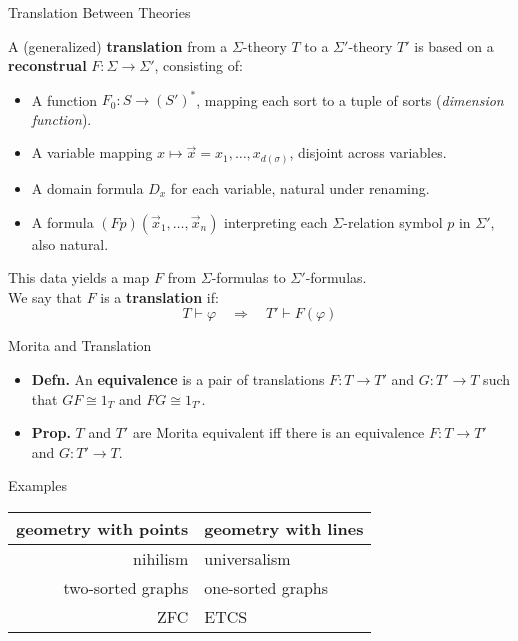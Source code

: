 \documentclass[fleqn]{beamer}
\begin{document}
\begin{frame}{Translation Between Theories}

\small

A (generalized) \textbf{translation} from a \( \Sigma \)-theory \( T \)
to a \( \Sigma' \)-theory \( T' \) is based on a \textbf{reconstrual}
\( F: \Sigma \to \Sigma' \), consisting of:

\begin{itemize}
\item A function $F_0: S \to (S')^*$, mapping each sort to a tuple of
  sorts (\textit{dimension function}).
\item A variable mapping
  $x \mapsto \vec{x} = x_1, \dots, x_{d(\sigma)}$, disjoint across
  variables.
\item A domain formula $D_x$ for each variable, natural under
  renaming.
\item A formula $(Fp)(\vec{x}_1, \dots, \vec{x}_n)$ interpreting each
  $\Sigma$-relation symbol $p$ in $\Sigma'$, also natural.
\end{itemize}

This data yields a map \( F\) from \( \Sigma \)-formulas to \( \Sigma' \)-formulas.\\[0.4em]
We say that $F$ is a \textbf{translation} if:
\[ T\vdash \varphi \quad \Rightarrow \quad T' \vdash F(\varphi)
\]

\end{frame}


\begin{frame}{Morita and Translation}

  \begin{itemize}
  \item \textbf{Defn.} An \textbf{equivalence} is a pair of
    translations $F:T\to T'$ and $G:T'\to T$ such that $GF\cong 1_T$
    and $FG\cong 1_{T'}$.
  \item \textbf{Prop.} $T$ and $T'$ are Morita equivalent iff there is
    an equivalence $F:T\to T'$ and $G:T'\to T$.
  \end{itemize}



\end{frame}


\begin{frame}{Examples}

  \begin{tabular}{r|l}
    geometry with points & geometry with lines \\
    \hline nihilism & universalism \\
    \hline two-sorted graphs & one-sorted graphs \\
    \hline ZFC & ETCS \end{tabular}

\end{frame}
\end{document}
